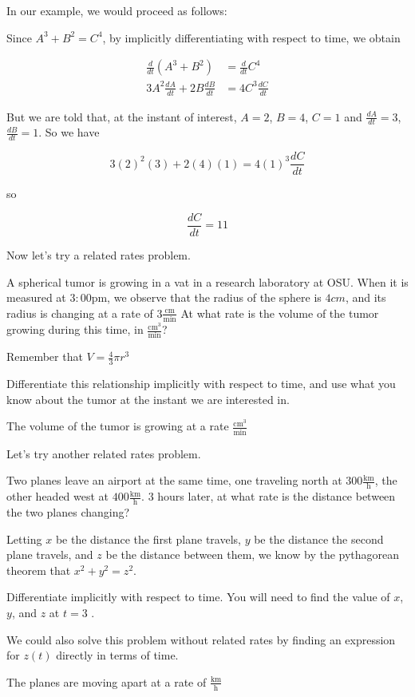 \documentclass{ximera}
\begin{document}
In our example, we would proceed as follows:

Since $A^3+B^2 = C^4$, by implicitly differentiating with respect to
time, we obtain

\begin{align*}
\frac{d}{dt}\left( A^3+B^2 \right) &= \frac{d}{dt} C^4\\ 
3A^2\frac{dA}{dt}+2B\frac{dB}{dt} &= 4C^3\frac{dC}{dt}
\end{align*}

But we are told that, at the instant of interest, $A=2$, $B=4$, $C=1$
and $\frac{dA}{dt} = 3$, $\frac{dB}{dt} = 1$.  So we have

\[
3(2)^2(3)+2(4)(1) = 4(1)^3\frac{dC}{dt}
\]

so 

\[
\frac{dC}{dt} = 11
\]

Now let's try a related rates problem.

\begin{question}
	A spherical tumor is growing in a vat in a research laboratory
        at OSU.  When it is measured at $3:00$pm, we observe that the
        radius of the sphere is $4cm$, and its radius is changing at a
        rate of $3 \frac{\textrm{cm}}{\textrm{min}}$ At what rate is
        the volume of the tumor growing during this time, in
        $\frac{\textrm{cm}^3}{\textrm{min}}$?
	\begin{hint}
	  Remember that $V = \frac{4}{3}\pi r^3$
	\end{hint}
	\begin{hint}
	  Differentiate this relationship implicitly with respect to
          time, and use what you know about the tumor at the instant
          we are interested in.
	\end{hint}
	The volume of the tumor is growing at a rate  $\frac{\textrm{cm}^3}{\textrm{min}}$
\end{question}

Let's try another related rates problem.

\begin{question}
  Two planes leave an airport at the same time, one traveling north at
  $300 \frac{\textrm{km}}{\textrm{h}} $, the other headed west at $400
  \frac{\textrm{km}}{\textrm{h}}$.  $3$ hours later, at what rate is
  the distance between the two planes changing?
  \begin{hint}
    Letting $x$ be the distance the first plane travels, $y$ be the
    distance the second plane travels, and $z$ be the distance between
    them, we know by the pythagorean theorem that $x^2+y^2=z^2$.
  \end{hint}
  \begin{hint}
    Differentiate implicitly with respect to time.  You will need to
    find the value of $x$, $y$, and $z$ at $t=3$ .
  \end{hint}
  \begin{hint}
    We could also solve this problem without related rates by finding
    an expression for $z(t)$ directly in terms of time.
  \end{hint}
  The planes are moving apart at a rate of 
  $\frac{\textrm{km}}{\textrm{h}}$
\end{question}
\end{document}
